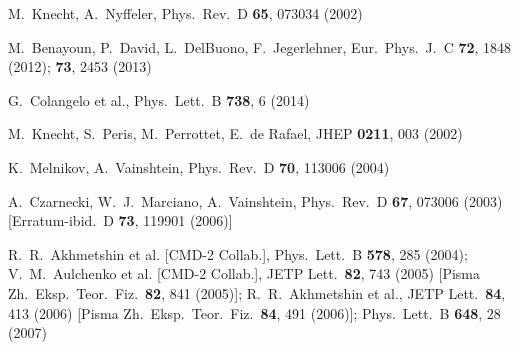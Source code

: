 \documentclass[epj,onecolumn]{webofc}
\begin{document}
\begin{thebibliography}{}
M.~Knecht, A.~Nyffeler,
Phys.\ Rev.\ D {\bf 65}, 073034 (2002)

M.~Benayoun, P.~David, L.~DelBuono, F.~Jegerlehner,
  Eur.\ Phys.\ J.\ C {\bf 72}, 1848 (2012);
%
 {\bf 73}, 2453 (2013)

  G.~Colangelo et al.,
  Phys.\ Lett.\ B {\bf 738}, 6 (2014)

M.~Knecht, S.~Peris, M.~Perrottet, E.~de Rafael,
JHEP {\bf 0211}, 003 (2002)

K.~Melnikov, A.~Vainshtein,
Phys.\ Rev.\ D {\bf 70}, 113006 (2004)

A.~Czarnecki, W.~J.~Marciano, A.~Vainshtein,
Phys.\ Rev.\ D {\bf 67}, 073006 (2003) [Erratum-ibid.\  D {\bf 73}, 119901 (2006)]

R.~R.~Akhmetshin et al.  [CMD-2 Collab.],
Phys.\ Lett.\ B {\bf 578}, 285 (2004);
%
V.~M.~Aulchenko et al.  [CMD-2 Collab.],
JETP Lett.\  {\bf 82}, 743 (2005)
[Pisma Zh.\ Eksp.\ Teor.\ Fiz.\  {\bf 82}, 841 (2005)];
R.~R.~Akhmetshin et al.,
JETP Lett.\  {\bf 84}, 413 (2006)
[Pisma Zh.\ Eksp.\ Teor.\ Fiz.\  {\bf 84}, 491 (2006)];
Phys.\ Lett.\  B {\bf 648}, 28 (2007)


\end{thebibliography}
\end{document}
